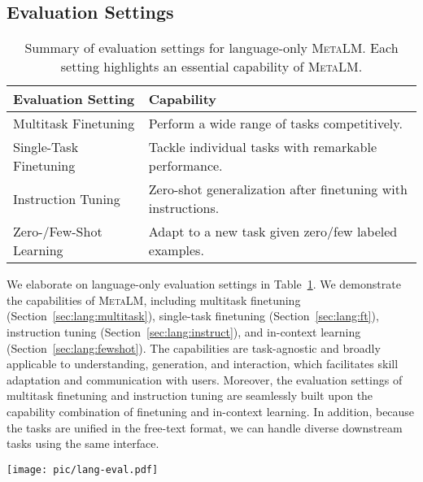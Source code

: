 \documentclass{article}
\theoremstyle{plain}
\theoremstyle{definition}
\theoremstyle{remark}
\newcommand\ours{\textsc{MetaLM}}
\begin{document}
\subsection{Evaluation Settings}
\label{sec:lang:eval}


\begin{table}[t]
\centering
\renewcommand{\arraystretch}{1.3}
\begin{tabular}{l l}
\toprule
\multicolumn{1}{l}{\textbf{Evaluation Setting}} & 
\multicolumn{1}{l}{\textbf{Capability}} \\
\midrule
Multitask Finetuning & Perform a wide range of tasks competitively. \\
Single-Task Finetuning & Tackle individual tasks with remarkable performance. \\
Instruction Tuning & Zero-shot generalization after finetuning with instructions. \\
Zero-/Few-Shot Learning & Adapt to a new task given zero/few labeled examples. \\
\bottomrule
\end{tabular}
\caption{Summary of evaluation settings for language-only \ours{}. Each setting highlights an essential capability of \ours{}.}
\label{tbl:lang:eval}
\end{table}

We elaborate on language-only evaluation settings in  Table~\ref{tbl:lang:eval}.
We demonstrate the capabilities of \ours{}, including multitask finetuning (Section~\ref{sec:lang:multitask}), single-task finetuning (Section~\ref{sec:lang:ft}), instruction tuning (Section~\ref{sec:lang:instruct}), and in-context learning (Section~\ref{sec:lang:fewshot}).
The capabilities are task-agnostic and broadly applicable to understanding, generation, and interaction, which facilitates skill adaptation and communication with users.
Moreover, the evaluation settings of multitask finetuning and instruction tuning are seamlessly built upon the capability combination of finetuning and in-context learning.
In addition, because the tasks are unified in the free-text format, we can handle diverse downstream tasks using the same interface.


\begin{figure*}[t]
\centering
\texttt{[image: pic/lang-eval.pdf]}
\caption{\ours{} can be applied in different language-only scenarios: (a) multitask finetuning and instruction tuning, i.e., perform various tasks simultaneously in an open-ended manner.
(b) multi-turn dialogue, i.e., generate multi-turn responses according to the encoded input of users.
(c) zero-shot priming, e.g., natural question answering.
(d) few-shot learning, e.g., sentiment analysis.}
\label{fig:lang:eval}
\end{figure*}
\end{document}
